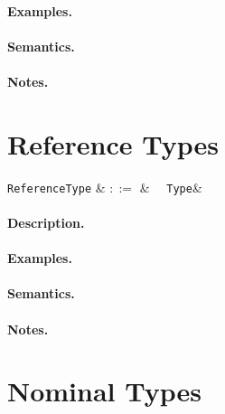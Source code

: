 \paragraph{Examples.}

\paragraph{Semantics.}

\paragraph{Notes.}


\section{Reference Types}

\begin{syntax}
  \verb+ReferenceType+ & $::=$ & \token{\&}\ \ \verb+Type+&\\
\end{syntax}

\paragraph{Description.}

\paragraph{Examples.}

\paragraph{Semantics.}

\paragraph{Notes.}


\section{Nominal Types}

